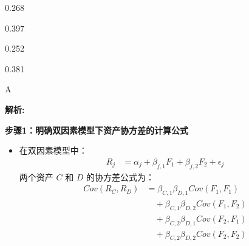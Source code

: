 \documentclass{article}
\newenvironment{explanation}
{\textbf{解析:}\par}
{\par}
\begin{document}
    \begin{choices}
        \item 0.268
        \item 0.397
        \item 0.252
        \item 0.381
    \end{choices}
    
    \begin{correctanswer}
        A
    \end{correctanswer}
    
    \begin{explanation}
        \textbf{步骤1：明确双因素模型下资产协方差的计算公式}
        \begin{itemize}
            \item 在双因素模型中：
            \begin{align*}
            R_j &= \alpha_j+\beta_{j,1}F_1+\beta_{j,2}F_2+\epsilon_j
            \end{align*}
            两个资产 \(C\) 和 \(D\) 的协方差公式为：
            \begin{align*}
            Cov(R_C,R_D) &= \beta_{C,1}\beta_{D,1}Cov(F_1,F_1) \\
                         &\quad + \beta_{C,1}\beta_{D,2}Cov(F_1,F_2) \\
                         &\quad + \beta_{C,2}\beta_{D,1}Cov(F_2,F_1) \\
                         &\quad + \beta_{C,2}\beta_{D,2}Cov(F_2,F_2)
            \end{align*}
            

\end{itemize}
\end{explanation}
\end{document}
